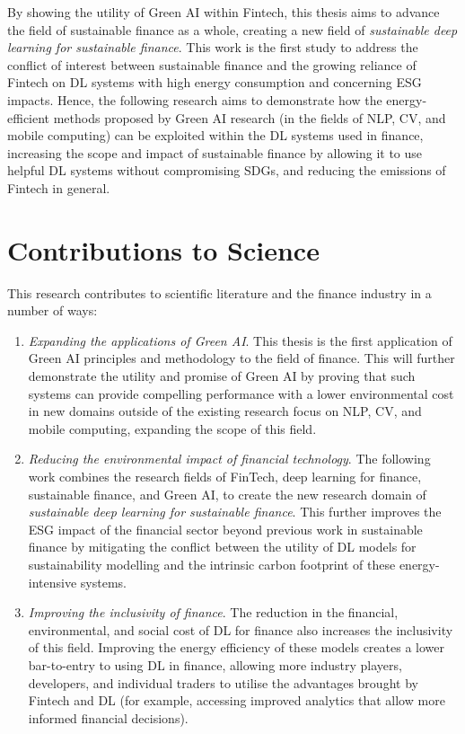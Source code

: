 \documentclass[a4paper, 11pt]{report}
\begin{document}
    By showing the utility of Green AI within Fintech, this thesis aims to advance the field of sustainable finance as a whole, creating a new field of \emph{sustainable deep learning for sustainable finance}. This work is the first study to address the conflict of interest between sustainable finance and the growing reliance of Fintech on DL systems with high energy consumption and concerning ESG impacts. Hence, the following research aims to demonstrate how the energy-efficient methods proposed by Green AI research (in the fields of NLP, CV, and mobile computing) can be exploited within the DL systems used in finance, increasing the scope and impact of sustainable finance by allowing it to use helpful DL systems without compromising SDGs, and reducing the emissions of Fintech in general.


    \section{Contributions to Science}
    \label{section: contributions}

    This research contributes to scientific literature and the finance industry in a number of ways:

    \begin{enumerate}
        \item \emph{Expanding the applications of Green AI}. This thesis is the first application of Green AI principles and methodology to the field of finance. This will further demonstrate the utility and promise of Green AI by proving that such systems can provide compelling performance with a lower environmental cost in new domains outside of the existing research focus on NLP, CV, and mobile computing, expanding the scope of this field.
        \item \emph{Reducing the environmental impact of financial technology}. The following work combines the research fields of FinTech, deep learning for finance, sustainable finance, and Green AI, to create the new research domain of \emph{sustainable deep learning for sustainable finance}. This further improves the ESG impact of the financial sector beyond previous work in sustainable finance by mitigating the conflict between the utility of DL models for sustainability modelling and the intrinsic carbon footprint of these energy-intensive systems.
        \item \emph{Improving the inclusivity of finance}. The reduction in the financial, environmental, and social cost of DL for finance also increases the inclusivity of this field. Improving the energy efficiency of these models creates a lower bar-to-entry to using DL in finance, allowing more industry players, developers, and individual traders to utilise the advantages brought by Fintech and DL (for example, accessing improved analytics that allow more informed financial decisions).
    \end{enumerate}
\end{document}
